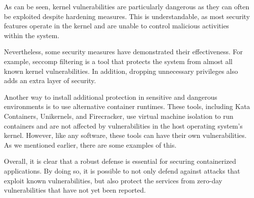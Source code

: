 As can be seen, kernel vulnerabilities are particularly dangerous as they can often be exploited despite hardening measures. This is understandable, as most security features operate in the kernel and are unable to control malicious activities within the system.

Nevertheless, some security measures have demonstrated their effectiveness. For example, seccomp filtering is a tool that protects the system from almost all known kernel vulnerabilities. In addition, dropping unnecessary privileges also adds an extra layer of security.

Another way to install additional protection in sensitive and dangerous environments is to use alternative container runtimes. These tools, including Kata Containers, Unikernels, and Firecracker, use virtual machine isolation to run containers and are not affected by vulnerabilities in the host operating system's kernel. However, like any software, these tools can have their own vulnerabilities. As we mentioned earlier, there are some examples of this.

Overall, it is clear that a robust defense is essential for securing containerized applications. By doing so, it is possible to not only defend against attacks that exploit known vulnerabilities, but also protect the services from zero-day vulnerabilities that have not yet been reported.
